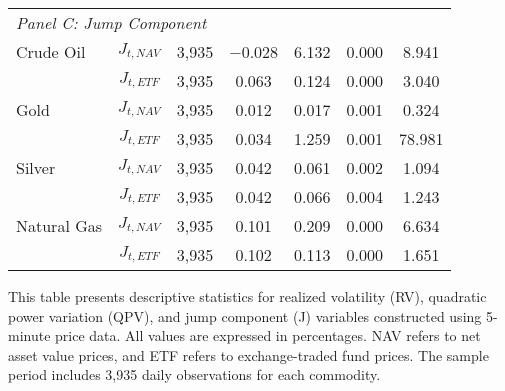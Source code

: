 \begin{table}[htbp]
\begin{threeparttable}
\begin{tabular}{@{}lcccccc@{}}
\multicolumn{7}{l}{\textit{Panel C: Jump Component}} \\
\addlinespace[0.1cm]
Crude Oil & $J_{t,NAV}$ & 3,935 & $-$0.028 & 6.132 & 0.000 & 8.941 \\
          & $J_{t,ETF}$ & 3,935 & 0.063 & 0.124 & 0.000 & 3.040 \\
\addlinespace[0.05cm]
Gold      & $J_{t,NAV}$ & 3,935 & 0.012 & 0.017 & 0.001 & 0.324 \\
          & $J_{t,ETF}$ & 3,935 & 0.034 & 1.259 & 0.001 & 78.981 \\
\addlinespace[0.05cm]
Silver    & $J_{t,NAV}$ & 3,935 & 0.042 & 0.061 & 0.002 & 1.094 \\
          & $J_{t,ETF}$ & 3,935 & 0.042 & 0.066 & 0.004 & 1.243 \\
\addlinespace[0.05cm]
Natural Gas & $J_{t,NAV}$ & 3,935 & 0.101 & 0.209 & 0.000 & 6.634 \\
            & $J_{t,ETF}$ & 3,935 & 0.102 & 0.113 & 0.000 & 1.651 \\
\bottomrule
\end{tabular}
\begin{tablenotes}
\small
\item This table presents descriptive statistics for realized volatility (RV), quadratic power variation (QPV), and jump component (J) variables constructed using 5-minute price data. All values are expressed in percentages. NAV refers to net asset value prices, and ETF refers to exchange-traded fund prices. The sample period includes 3,935 daily observations for each commodity.
\end{tablenotes}
\end{threeparttable}
\end{table}


